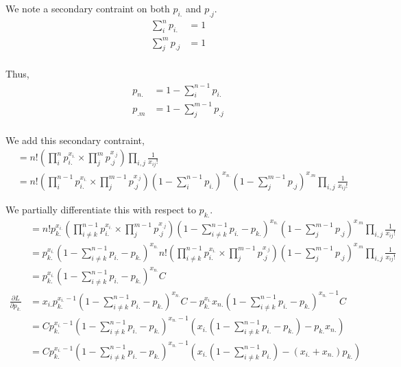 \documentclass{article}
\begin{document}
We note a secondary contraint on both $p_{i.}$ and $p_{.j}$.
\begin{align*}
    \sum_i^n p_{i.} &= 1 \\
    \sum_j^m p_{.j} &= 1 \\
\end{align*}

Thus,
\begin{align*}
    p_{n.} &= 1 - \sum_i^{n-1} p_{i.} \\
    p_{.m} &= 1 - \sum_j^{m-1} p_{.j} \\
\end{align*}

We add this secondary contraint,
\begin{align*}
    &= n! \left(\prod_i^n p_{i.}^{x_{i.}} \times \prod_j^m p_{.j}^{x_{.j}}\right)
    \prod_{i,j} \frac{1}{x_{ij}!}  \\
    &= n! \left(\prod_i^{n-1} p_{i.}^{x_{i.}} \times \prod_j^{m-1} p_{.j}^{x_{.j}}\right)
    \left(1 - \sum_i^{n-1} p_{i.}\right)^{x_{n.}}\left(1 - \sum_j^{m-1} p_{.j}\right)^{x_{.m}}
    \prod_{i,j} \frac{1}{x_{ij}!} 
\end{align*}

We partially differentiate this with respect to $p_{k.}$.
\begin{align*}
    &= n! p_{k.}^{x_{i.}} \left(\prod_{i \neq k}^{n-1} p_{i.}^{x_{i.}} \times \prod_j^{m-1} p_{.j}^{x_{.j}}\right)
    \left(1 - \sum_{i\neq k}^{n-1} p_{i.} - p_{k.}\right)^{x_{n.}}\left(1 - \sum_j^{m-1} p_{.j}\right)^{x_{.m}}
    \prod_{i,j} \frac{1}{x_{ij}!} \\
    &= p_{k.}^{x_{i.}} \left(1 - \sum_{i\neq k}^{n-1} p_{i.} - p_{k.}\right)^{x_{n.}}
    n!\left(\prod_{i \neq k}^{n-1} p_{i.}^{x_{i.}} \times \prod_j^{m-1} p_{.j}^{x_{.j}}\right)
    \left(1 - \sum_j^{m-1} p_{.j}\right)^{x_{.m}}
    \prod_{i,j} \frac{1}{x_{ij}!} \\
    &= p_{k.}^{x_{i.}} \left(1 - \sum_{i\neq k}^{n-1} p_{i.} - p_{k.}\right)^{x_{n.}} C \\
    \frac{\partial L}{\partial p_{k.}}
    &= x_{i.} p_{k.}^{x_{i.}-1} \left(1 - \sum_{i\neq k}^{n-1} p_{i.} - p_{k.}\right)^{x_{n.}} C
    - p_{k.}^{x_{i.}} x_{n.} \left(1 - \sum_{i\neq k}^{n-1} p_{i.} - p_{k.}\right)^{x_{n.}-1} C \\
    &= C p_{k.}^{x_{i.}-1} \left(1 - \sum_{i\neq k}^{n-1} p_{i.} - p_{k.}\right)^{x_{n.}-1}
    \left(x_{i.} \left(1 - \sum_{i\neq k}^{n-1} p_{i.} - p_{k.}\right) - p_{k.} x_{n.}\right) \\
    &= C p_{k.}^{x_{i.}-1} \left(1 - \sum_{i\neq k}^{n-1} p_{i.} - p_{k.}\right)^{x_{n.}-1}
    \left(x_{i.} \left(1 - \sum_{i\neq k}^{n-1} p_{i.}\right) - (x_{i.} + x_{n.})p_{k.}\right) \\
\end{align*}
\end{document}
